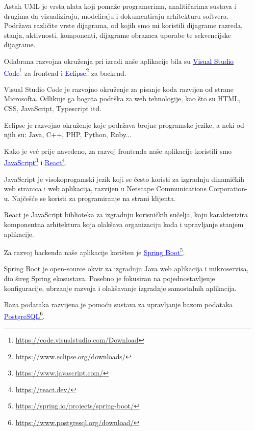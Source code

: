 Astah UML je vrsta alata koji pomaže programerima, analitičarima sustava i drugima da vizualiziraju, modeliraju i dokumentiraju arhitekturu softvera. Podržava različite vrste dijagrama, od kojih smo mi koristili dijagrame razreda, stanja, aktivnosti, komponenti, dijagrame obrazaca uporabe te sekvencijske dijagrame.

Odabrana razvojna okruženja pri izradi naše aplikacije bila su \textcolor{blue}{\underline{\href{https://code.visualstudio.com/Download}{\textcolor{blue}{Visual Studio Code}}}}\footnote{\url{https://code.visualstudio.com/Download}} za frontend i \textcolor{blue}{\underline{\href{https://www.eclipse.org/downloads/}{\textcolor{blue}{Eclipse}}}}\footnote{\url{https://www.eclipse.org/downloads/}} za backend.


Visual Studio Code je razvojno okruženje za pisanje koda razvijen od strane Microsofta. Odlikuje ga bogata podrška za web tehnologije, kao što su HTML, CSS, JavaScript, Typescript itd.

Eclipse je razvojno okruženje koje podržava brojne programske jezike, a neki od njih su: Java, C++, PHP, Python, Ruby...

Kako je već prije navedeno, za razvoj frontenda naše aplikacije koristili smo \textcolor{blue}{\underline{\href{https://www.javascript.com/}{\textcolor{blue}{JavaScript}}}}\footnote{\url{https://www.javascript.com/}} i \textcolor{blue}{\underline{\href{https://react.dev/}{\textcolor{blue}{React}}}}\footnote{\url{https://react.dev/}}.

JavaScript je visokoprogamski jezik koji se često koristi za izgradnju dinamičkih web stranica i web aplikacija, razvijen u Netscape Communications Corporation-u. Najčešće se koristi za programiranje na strani klijenta.

React je JavaScript biblioteka za izgradnju korisničkih sučelja, koju karakterizira komponentna arhitektura koja olakšava organizaciju koda i upravljanje stanjem aplikacije.

Za razvoj backenda naše aplikacije korišten je \textcolor{blue}{\underline{\href{https://spring.io/projects/spring-boot/}{\textcolor{blue}{Spring Boot}}}}\footnote{\url{https://spring.io/projects/spring-boot/}}.

Spring Boot je open-source okvir za izgradnju Java web aplikacija i mikroservisa, dio šireg Spring ekosustava. Posebno je fokusiran na pojednostavljenje konfiguracije, ubrzanje razvoja i olakšavanje izgradnje samostalnih aplikacija.


Baza podataka razvijena je pomoću sustava za upravljanje bazom podataka \textcolor{blue}{\underline{\href{https://www.postgresql.org/download/}{\textcolor{blue}{PostgreSQL}}}}\footnote{\url{https://www.postgresql.org/download/}}.
			\eject 
			
